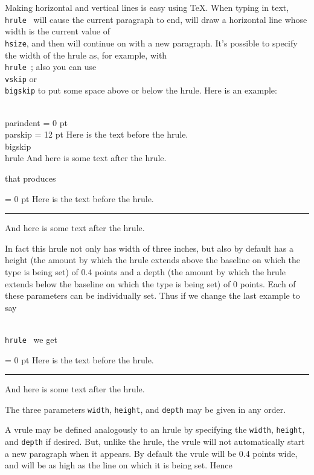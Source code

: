 Making horizontal and vertical lines is easy using \TeX\null. 
When typing in text, {\tt \\hrule } will cause the current 
paragraph to end, will draw a horizontal line whose width is the 
current value of {\tt \\hsize}, and then will continue on with a 
new paragraph.  It's possible to specify the width of the hrule 
as, for example, with {\tt \\hrule width 5 cm}; also you can use 
{\tt \\vskip} or {\tt \\bigskip} to put some space above or below 
the hrule.  Here is an example: 
 
\beginuser 
\\parindent = 0 pt \\parskip = 12 pt 
Here is the text before the hrule. 
\\bigskip 
\\hrule width 3 in 
And here is some text after the hrule. 
\enduser 
 
\noindent that produces 
\vfill\eject 
 
{ 
\parindent = 0 pt 
Here is the text before the hrule. 
\bigskip 
\hrule width 3 in 
And here is some text after the hrule. 
} 
 
In fact this hrule not only has width of three inches, but also 
by default has a height (the amount by which the hrule extends 
above the baseline on which the type is being set) of 0.4 points 
and a depth (the amount by which the hrule extends below the 
baseline on which the type is being set) of 0 points.  Each of 
these parameters can be individually set.  Thus if we change the 
last example to say 
 
{\tt \\hrule width 3 in height 2 pt depth 3 pt } we get 
 
{ 
\parindent = 0 pt 
Here is the text before the hrule. 
\bigskip 
\hrule width 3 in height 2 pt depth 3 pt 
And here is some text after the hrule. 
} 
 
The three parameters {\tt width}, {\tt height}, and {\tt depth} may 
be given in any order. 
 
A vrule may be defined analogously to an hrule by specifying the 
{\tt width}, {\tt height}, and {\tt depth} if desired. 
But, unlike the hrule, the vrule will not automatically start a 
new paragraph when it appears.  By default the vrule will be 0.4 
points wide, and will be as high as the line on which it is being 
set. Hence 
 
